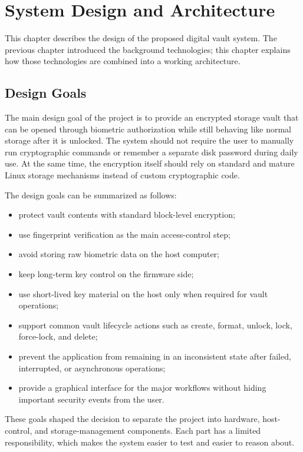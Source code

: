 \chapter{System Design and Architecture}

This chapter describes the design of the proposed digital vault system. The previous chapter introduced the background technologies; this chapter explains how those technologies are combined into a working architecture.

\section{Design Goals}

The main design goal of the project is to provide an encrypted storage vault that can be opened through biometric authorization while still behaving like normal storage after it is unlocked. The system should not require the user to manually run cryptographic commands or remember a separate disk password during daily use. At the same time, the encryption itself should rely on standard and mature Linux storage mechanisms instead of custom cryptographic code.

The design goals can be summarized as follows:

\begin{itemize}
    \item protect vault contents with standard block-level encryption;
    \item use fingerprint verification as the main access-control step;
    \item avoid storing raw biometric data on the host computer;
    \item keep long-term key control on the firmware side;
    \item use short-lived key material on the host only when required for vault operations;
    \item support common vault lifecycle actions such as create, format, unlock, lock, force-lock, and delete;
    \item prevent the application from remaining in an inconsistent state after failed, interrupted, or asynchronous operations;
    \item provide a graphical interface for the major workflows without hiding important security events from the user.
\end{itemize}

These goals shaped the decision to separate the project into hardware, host-control, and storage-management components. Each part has a limited responsibility, which makes the system easier to test and easier to reason about.

